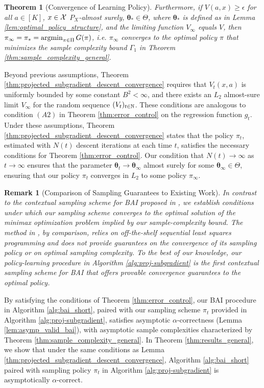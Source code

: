\documentclass{article}
\newtheorem{theorem}{Theorem}
\newtheorem{remark}{Remark}
\begin{document}
\begin{theorem}[Convergence of Learning Policy]
     Furthermore, if $V(a,x) \geq \epsilon$ for all $a \in [K]$, $x \in \mathcal{X}$ $P_X$-almost surely, $\bm{\theta}_* \in \Theta$, where $\bm{\theta}_*$ is defined as in Lemma \ref{lem:optimal_policy_structure}, and the limiting function $V_\infty$ equals $V$, then $\pi_\infty = \pi_* = \argmin_{\pi \in \Pi} G(\pi)$, i.e. $\pi_\infty$ converges to the optimal policy $\pi$ that minimizes the sample complexity bound $\Gamma_1$ in Theorem \ref{thm:sample_complexity_general}. 
\end{theorem}

Beyond previous assumptions, Theorem \ref{thm:projected_subgradient_descent_convergence} requires that  $V_t(x,a)$ is uniformly bounded by some constant $B^2 < \infty$, and there exists an $L_2$ almost-sure limit $V_\infty$ for the random sequence $(V_t)_{t \in \mathbb{N}}$. These conditions are analogous to condition $(A2)$ in Theorem \ref{thm:error_control} on the regression function $g_t$. Under these assumptions, Theorem \ref{thm:projected_subgradient_descent_convergence} states that the policy $\pi_t$, estimated with $N(t)$ descent iterations at each time $t$, satisfies the necessary conditions for Theorem \ref{thm:error_control}. Our condition that $N(t) \rightarrow \infty$ as $t \rightarrow \infty$ ensures that the parameter $\bm{\theta}_t \rightarrow \bm{\theta}_\infty$ almost surely for some $\bm{\theta}_\infty \in \Theta$, ensuring that our policy $\pi_t$ converges in $L_2$ to some policy $\pi_{\infty}$. 

\begin{remark}[Comparison of Sampling Guarantees to Existing Work]
In contrast to the contextual sampling scheme for BAI proposed in \cite{kato2024rolecontextualinformationbest}, we establish conditions under which our sampling scheme converges to the optimal solution of the minimax optimization problem implied by our sample-complexity bound. The method in \cite{kato2024rolecontextualinformationbest}, by comparison, relies on off-the-shelf sequential least squares programming and does not provide guarantees on the convergence of its sampling policy or on optimal sampling complexity. To the best of our knowledge, our policy-learning procedure in Algorithm \ref{alg:proj-subgradient} is the first contextual sampling scheme for BAI that offers provable convergence guarantees to the optimal policy.    
\end{remark}


By satisfying the conditions of Theorem \ref{thm:error_control}, our BAI procedure in Algorithm \ref{alg:bai_short}, paired with our sampling scheme $\pi_t$ provided in Algorithm \ref{alg:proj-subgradient}, satisfies asymptotic $\alpha$-correctness (Lemma \ref{lem:asymp_valid_bai}), with asymptotic sample complexities characterized by Theorem \ref{thm:sample_complexity_general}. In Theorem \ref{thm:results_general}, we show that under the same conditions as Lemma \ref{thm:projected_subgradient_descent_convergence}, Algorithm \ref{alg:bai_short} paired with sampling policy $\pi_t$ in Algorithm \ref{alg:proj-subgradient} is asymptotically $\alpha$-correct.  
\end{document}
